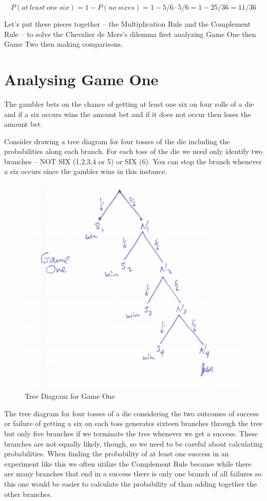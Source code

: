 \documentclass[]{book}
\theoremstyle{definition}
\theoremstyle{definition}
\theoremstyle{definition}
\theoremstyle{remark}
\begin{document}
\[P(at \ least \ one \ six)= 1-P(no \ sixes)= 1-5/6 \cdot 5/6=1-25/36=11/36\]

Let's put these pieces together -- the Multiplication Rule and the
Complement Rule -- to solve the Chevalier de Mere's dilemma first
analyzing Game One then Game Two then making comparisons.

\section{Analysing Game One}\label{analysing-game-one}

The gambler bets on the chance of getting at least one six on four rolls
of a die and if a six occurs wins the amount bet and if it does not
occur then loses the amount bet.

Consider drawing a tree diagram for four tosses of the die including the
probabilities along each branch. For each toss of the die we need only
identify two branches -- NOT SIX (1,2,3,4 or 5) or SIX (6). You can stop
the branch whenever a six occurs since the gambler wins in this
instance.

\begin{figure}

{\centering \includegraphics[width=0.3\linewidth]{01-basics-figures/chevalier_game_one} 

}

\caption{Tree Diagram for Game One}\label{fig:nice-fig-63}
\end{figure}

The tree diagram for four tosses of a die considering the two outcomes
of success or failure of getting a six on each toss generates sixteen
branches through the tree but only five branches if we terminate the
tree whenever we get a success. These branches are not equally likely,
though, so we need to be careful about calculating probabilities. When
finding the probability of at least one success in an experiment like
this we often utilize the Complement Rule because while there are many
branches that end in a success there is only one branch of all failures
so this one would be easier to calculate the probability of than adding
together the other branches.
\end{document}

